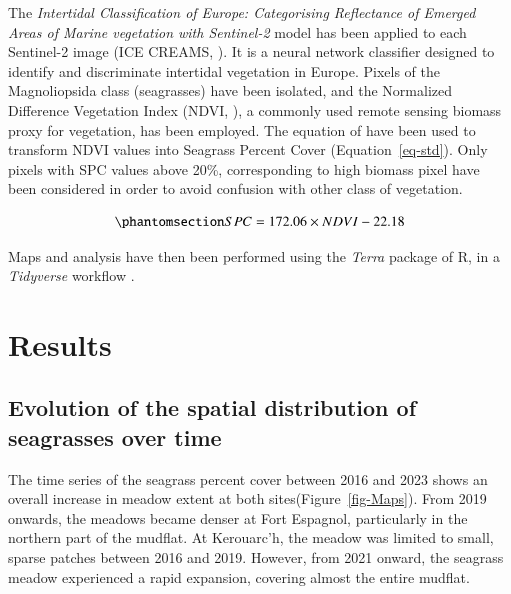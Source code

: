 \documentclass[
  number]{elsarticle}
\begin{document}
The \emph{Intertidal Classification of Europe: Categorising Reflectance
of Emerged Areas of Marine vegetation with Sentinel-2} model has been
applied to each Sentinel-2 image (ICE CREAMS, \citep{Davies2024}). It is
a neural network classifier designed to identify and discriminate
intertidal vegetation in Europe. Pixels of the Magnoliopsida class
(seagrasses) have been isolated, and the Normalized Difference
Vegetation Index (NDVI, \citep{rouse1974monitoring}), a commonly used
remote sensing biomass proxy for vegetation, has been employed. The
equation of \citep{zoffoli2020sentinel} have been used to transform NDVI
values into Seagrass Percent Cover (Equation~\ref{eq-std}). Only pixels
with SPC values above 20\%, corresponding to high biomass pixel have
been considered in order to avoid confusion with other class of
vegetation.

\begin{equation}\phantomsection\label{eq-std}{
SPC = 172.06 \times NDVI - 22.18
}\end{equation}

Maps and analysis have then been performed using the \emph{Terra}
package of R, in a \emph{Tidyverse} workflow \citetext{\citealp[
]{hijmans2023terra}; \citealp{wickham2017easily}}.

\section{Results}\label{results}

\subsection{Evolution of the spatial distribution of seagrasses over
time}\label{evolution-of-the-spatial-distribution-of-seagrasses-over-time}

The time series of the seagrass percent cover between 2016 and 2023
shows an overall increase in meadow extent at both
sites(Figure~\ref{fig-Maps}). From 2019 onwards, the meadows became
denser at Fort Espagnol, particularly in the northern part of the
mudflat. At Kerouarc'h, the meadow was limited to small, sparse patches
between 2016 and 2019. However, from 2021 onward, the seagrass meadow
experienced a rapid expansion, covering almost the entire mudflat.
\end{document}
